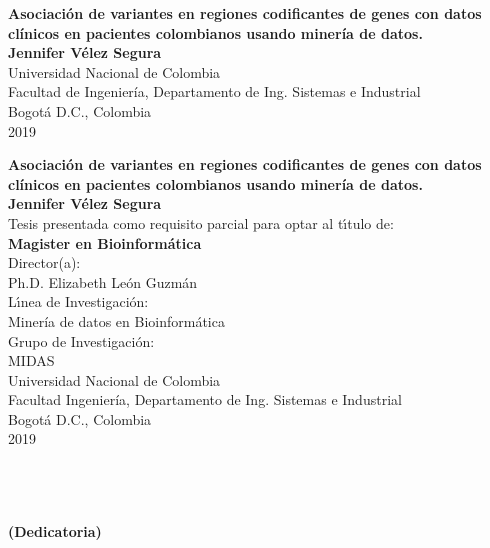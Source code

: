 \begin{center}
\begin{figure}
\centering%
\end{figure}
\thispagestyle{empty} \vspace*{0cm} \textbf{\huge
Asociación de variantes en regiones codificantes de genes con datos clínicos en
pacientes colombianos usando minería de datos.}\\[5.0cm]
\Large\textbf{Jennifer Vélez Segura}\\[5.0cm]
\small Universidad Nacional de Colombia\\
Facultad de Ingeniería, Departamento de Ing. Sistemas e Industrial\\
Bogotá D.C., Colombia\\
2019\\
\end{center}

\newpage{\pagestyle{empty}\cleardoublepage}

\newpage
\begin{center}
\thispagestyle{empty} \vspace*{0cm} \textbf{\huge
Asociación de variantes en regiones codificantes de genes con datos clínicos en
pacientes colombianos usando minería de datos.}\\[2.0cm]
\Large\textbf{Jennifer Vélez Segura}\\[2.0cm]
\small Tesis presentada como requisito parcial para optar al
t\'{\i}tulo de:\\
\textbf{Magister en Bioinformática}\\[2.5cm]
Director(a):\\
Ph.D. Elizabeth León Guzmán\\[2.0cm]
L\'{\i}nea de Investigaci\'{o}n:\\
Minería de datos en Bioinformática\\
Grupo de Investigaci\'{o}n:\\
MIDAS\\[2.5cm]
Universidad Nacional de Colombia\\
Facultad Ingeniería, Departamento de Ing. Sistemas e Industrial\\
Bogotá D.C., Colombia\\
2019 \\
\end{center}

\newpage{\pagestyle{empty}\cleardoublepage}

\newpage
\thispagestyle{empty} \textbf{}\normalsize
\\\\\\%
\textbf{(Dedicatoria)}\\[4.0cm]

